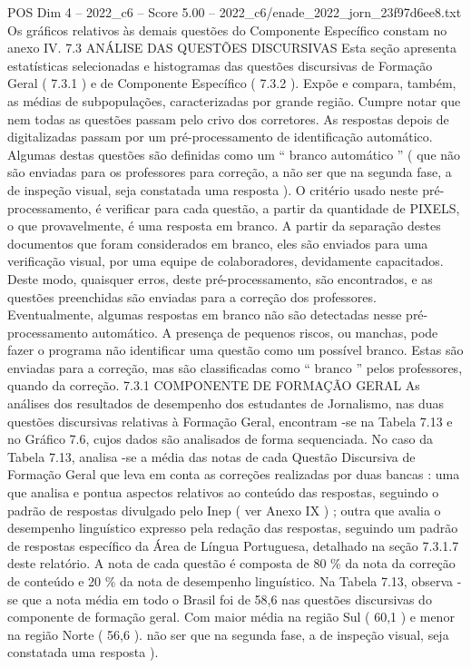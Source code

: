 \begin{textsample}{POS Dim 4 – 2022\_c6 – Score 5.00 – 2022\_c6/enade\_2022\_jorn\_23f97d6ee8.txt}
Os gráficos relativos às demais questões do Componente Específico constam no anexo IV. 7.3 ANÁLISE DAS QUESTÕES DISCURSIVAS Esta seção apresenta estatísticas selecionadas e histogramas das questões discursivas de Formação Geral ( 7.3.1 ) e de Componente Específico ( 7.3.2 ).
Expõe e compara, também, as médias de subpopulações, caracterizadas por grande região.
Cumpre notar que nem todas as questões passam pelo crivo dos corretores.
As respostas depois de digitalizadas passam por um pré-processamento de identificação automático.
Algumas destas questões são definidas como um “ branco automático ” ( que não são enviadas para os professores para correção, a não ser que na segunda fase, a de inspeção visual, seja constatada uma resposta ).
O critério usado neste pré-processamento, é verificar para cada questão, a partir da quantidade de PIXELS, o que provavelmente, é uma resposta em branco.
A partir da separação destes documentos que foram considerados em branco, eles são enviados para uma verificação visual, por uma equipe de colaboradores, devidamente capacitados.
Deste modo, quaisquer erros, deste pré-processamento, são encontrados, e as questões preenchidas são enviadas para a correção dos professores.
Eventualmente, algumas respostas em branco não são detectadas nesse pré-processamento automático.
A presença de pequenos riscos, ou manchas, pode fazer o programa não identificar uma questão como um possível branco.
Estas são enviadas para a correção, mas são classificadas como “ branco ” pelos professores, quando da correção. 7.3.1 COMPONENTE DE FORMAÇÃO GERAL As análises dos resultados de desempenho dos estudantes de Jornalismo, nas duas questões discursivas relativas à Formação Geral, encontram -se na Tabela 7.13 e no Gráfico 7.6, cujos dados são analisados de forma sequenciada.
No caso da Tabela 7.13, analisa -se a média das notas de cada Questão Discursiva de Formação Geral que leva em conta as correções realizadas por duas bancas : uma que analisa e pontua aspectos relativos ao conteúdo das respostas, seguindo o padrão de respostas divulgado pelo Inep ( ver Anexo IX ) ; outra que avalia o desempenho linguístico expresso pela redação das respostas, seguindo um padrão de respostas específico da Área de Língua Portuguesa, detalhado na seção 7.3.1.7 deste relatório.
A nota de cada questão é composta de 80 \% da nota da correção de conteúdo e 20 \% da nota de desempenho linguístico.
Na Tabela 7.13, observa -se que a nota média em todo o Brasil foi de 58,6 nas questões discursivas do componente de formação geral.
Com maior média na região Sul ( 60,1 ) e menor na região Norte ( 56,6 ). não ser que na segunda fase, a de inspeção visual, seja constatada uma resposta ).

\end{textsample}
